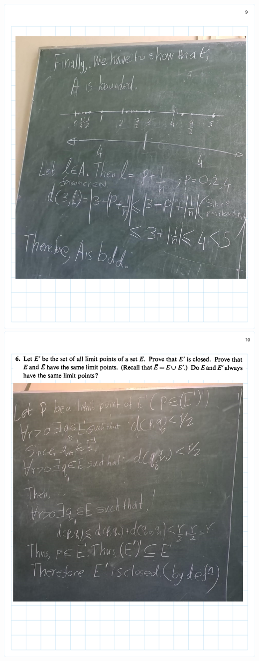\documentclass[
]{book}
\theoremstyle{definition}
\theoremstyle{definition}
\theoremstyle{definition}
\theoremstyle{definition}
\theoremstyle{remark}
\begin{document}
\includegraphics{Figures/Ex-2/Rudin Ch2-9.png}
\includegraphics{Figures/Ex-2/Rudin Ch2-10.png}
\end{document}

